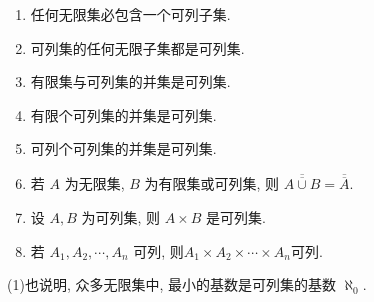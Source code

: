 \documentclass[../../main.tex]{subfiles}%
\begin{document}
\begin{theorem}[可列集的性质]\label{theorem:可列集的性质}
\begin{enumerate}[(1)]
\item\label{theorem:可列集的性质(1)} 任何无限集必包含一个可列子集.

\item\label{theorem:可列集的性质(2)} 可列集的任何无限子集都是可列集.

\item\label{theorem:可列集的性质(3)} 有限集与可列集的并集是可列集.

\item\label{theorem:可列集的性质(4)} 有限个可列集的并集是可列集.

\item\label{theorem:可列集的性质(5)} 可列个可列集的并集是可列集.

\item\label{theorem:可列集的性质(6)} 若 $A$ 为无限集, $B$ 为有限集或可列集, 则 $\overline{\overline{A \cup B}} = \overline{\overline{A}}$.

\item\label{theorem:可列集的性质(7)} 设 $A, B$ 为可列集, 则 $A \times B$ 是可列集.

\item\label{theorem:可列集的性质(8)} 若 $A_1, A_2, \cdots, A_n$ 可列, 则$A_1 \times A_2 \times \cdots \times A_n$可列. 
\end{enumerate}
\end{theorem}
\begin{note}
(1)也说明, 众多无限集中, 最小的基数是可列集的基数 $\aleph_0$.
\end{note}
\end{document}
